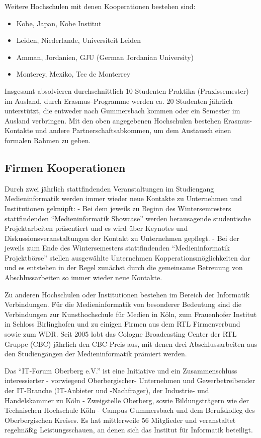 Weitere Hochschulen mit denen Kooperationen bestehen sind:

\begin{itemize}
\tightlist
\item
  Kobe, Japan, Kobe Institut
\item
  Leiden, Niederlande, Universiteit Leiden
\item
  Amman, Jordanien, GJU (German Jordanian University)
\item
  Monterey, Mexiko, Tec de Monterrey
\end{itemize}

Insgesamt absolvieren durchschnittlich 10 Studenten Praktika
(Praxissemester) im Ausland, durch Erasmus--Programme werden ca. 20
Studenten jährlich unterstützt, die entweder nach Gummersbach kommen
oder ein Semester im Ausland verbringen. Mit den oben angegebenen
Hochschulen bestehen Erasmus-Kontakte und andere Partnerschaftsabkommen,
um dem Austausch einen formalen Rahmen zu geben.

\subsection{Firmen Kooperationen}\label{firmen-kooperationen}

Durch zwei jährlich stattfindenden Veranstaltungen im Studiengang
Medieninformatik werden immer wieder neue Kontakte zu Unternehmen und
Institutionen geknüpft: - Bei dem jeweils zu Beginn des Wintersemresters
stattfindenden ``Medieninformatik Showcase'' werden herausagende
studentische Projektarbeiten präsentiert und es wird über Keynotes und
Diskussionsveranstaltungen der Kontakt zu Unternehmen gepflegt. - Bei
der jeweils zum Ende des Wintersemesters stattfindenden
``Medieninformatik Projektbörse'' stellen ausgewählte Unternehmen
Kopperationsmöglichkeiten dar und es entstehen in der Regel zunächst
durch die gemeinsame Betreuung von Abschlussarbeiten so immer wieder
neue Kontakte.

Zu anderen Hochschulen oder Institutionen bestehen im Bereich der
Informatik Verbindungen. Für die Medieninformatik von besonderer
Bedeutung sind die Verbindungen zur Kunsthochschule für Medien in Köln,
zum Frauenhofer Institut in Schloss Birlinghofen und zu einigen Firmen
aus dem RTL Firmenverbund sowie zum WDR. Seit 2005 lobt das Cologne
Broadcasting Center der RTL Gruppe (CBC) jährlich den CBC-Preis aus, mit
denen drei Abschlussarbeiten aus den Studiengängen der Medieninformatik
prämiert werden.

Das ``IT-Forum Oberberg e.V.'' ist eine Initiative und ein
Zusammenschluss interessierter - vorwiegend Oberbergischer- Unternehmen
und Gewerbetreibender der IT-Branche (IT-Anbieter und -Nachfrager), der
Industrie- und Handelskammer zu Köln - Zweigstelle Oberberg, sowie
Bildungsträgern wie der Technischen Hochschule Köln - Campus Gummersbach
und dem Berufskolleg des Oberbergischen Kreises. Es hat mittlerweile 56
Mitglieder und veranstaltet regelmäßig Leistungsschauen, an denen sich
das Institut für Informatik beteiligt.

